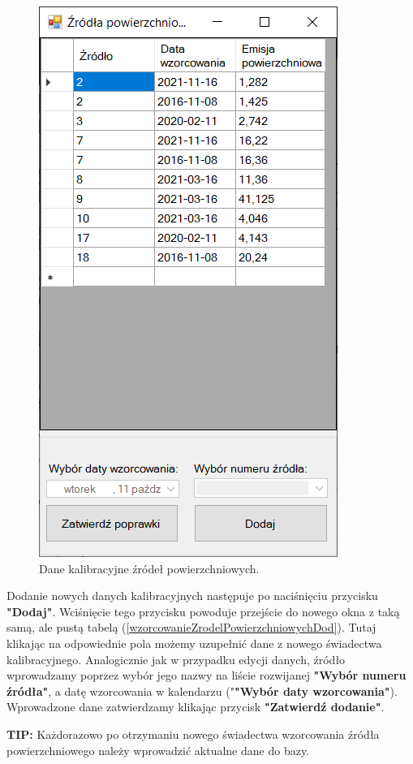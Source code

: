 \begin{figure}[htb]
	\centering
	\includegraphics{obrazki/Ustawienia/wzorcowanie_zrodel_powierzchniowych.png}
	\caption{Dane kalibracyjne źródeł powierzchniowych.}
	\label{wzorcowanieZrodelPowierzchniowych}
\end{figure}

Dodanie nowych danych kalibracyjnych następuje po naciśnięciu przycisku \textbf{"Dodaj"}. Wciśnięcie tego przycisku powoduje przejście do nowego okna z taką samą, ale pustą tabelą (\ref{wzorcowanieZrodelPowierzchniowychDod}). Tutaj klikając na odpowiednie pola możemy uzupełnić dane z nowego świadectwa kalibracyjnego. Analogicznie jak w przypadku edycji danych, źródło wprowadzamy poprzez wybór jego nazwy na liście rozwijanej \textbf{"Wybór numeru źródła"}, a datę wzorcowania w kalendarzu ("\textbf{"Wybór daty wzorcowania"}). Wprowadzone dane zatwierdzamy klikając przycisk \textbf{"Zatwierdź dodanie"}.

\textbf{TIP:} Każdorazowo po otrzymaniu nowego świadectwa wzorcowania źródła powierzchniowego należy wprowadzić aktualne dane do bazy.


